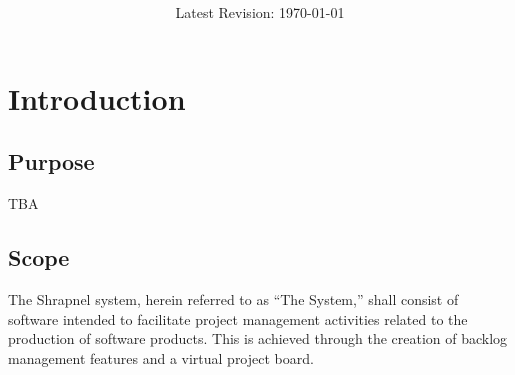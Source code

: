 \documentclass[12pt]{report}
\begin{document}

\title{ \\ \vspace{10pt} }
\author{}
\date{Latest Revision: \today}
\maketitle

\tableofcontents \newpage

\section{Introduction}
	\subsection{Purpose}
		TBA
	\subsection{Scope}
		The Shrapnel system, herein referred to as ``The System,'' shall consist of software intended to facilitate project management activities related to the production of software products.
		This is achieved through the creation of backlog management features and a virtual project board.
\end{document}
